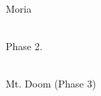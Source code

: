\documentclass{article}
\begin{document}
\, \\

Moria

\Ttelco \TTthreedots \Ttinco  \Ts \Tnuumen \TTdot \Tanga \Taha \Ttinco \Tcentereddot \Ts \Tsilmenuquerna \TTacute \Ttelco \TTthreedots \Toore \Tcalma \Taha  \Ts \Tformen \TTrightcurl \Toore  \Ts \Ttelco \TTthreedots  \Ts \Tanna \TTtwodotsbelow \TTacute \Tlambe \TTdoubler \TTrightcurl \Tvilya  \Ts \Tlambe \TTdot \Tanga \Taha \Ttinco \Tcolon

\, \\

Phase 2.

\Ttinco \TTrightcurl  \Ts \Troomen \TTacute \Ttelco \TTthreedots \Tcalma \Taha  \Ts \Tmalta \Ttinco \Tcolon \Ts \Tando \TTrightcurl \TTrightcurl \Tmalta \Tcentereddot \Ts \Tvala \TTdot \Tsilmenuquerna \TTdot \Ttinco  \Ts {} \Tparma \Troomen \TTacute \Tcalma \TTrightcurl \Tparma \TTthreedots \Tnuumen \TTthreedots  \Ts \Thalla \Troomen \TTthreedots \Tesse \Ts {} \Ts \Ttelco \TTthreedots \Ttinco  \Ts \Tanca  \Ts \Tmalta \TTrightcurl \Toore \Tnuumen \TTdot \Tanga \Tcolon

\, \\

Mt. Doom (Phase 3)

\Tthuule \Troomen \TTrightcurl \Tvilya  \Ts \Tthuule \TTacute  \Ts \Troomen \TTdot \Tanga  \Ts \Ttinco \TTrightcurl  \Ts \Tthuule \TTacute  \Ts \Tumbar \TTrightcurl \Ttinco \TTdoubler \TTrightcurl \Tmalta  \Ts \Ttelco \TTrightcurl \Tformen  \Ts \Tthuule \TTacute  \Ts \Tlambe \TTthreedots \Tcalma \TTacute \Tcolon
\end{document}
